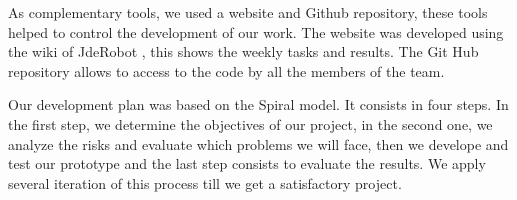 As complementary tools, we used a website and Github repository, these tools helped to control the development of our work. The website was developed using the wiki of JdeRobot \cite{wikiPieras}, this shows the weekly tasks and results. The Git Hub repository \cite{repoPieras} allows to access to the code by all the members of the team.

Our development plan was based on the Spiral model. It consists in four steps. In the first step, we determine the objectives of our project, in the second one, we analyze the risks and evaluate which problems we will face, then we develope and test our prototype and the last step consists to evaluate the results. We apply several iteration of this process till we get a satisfactory project.
































